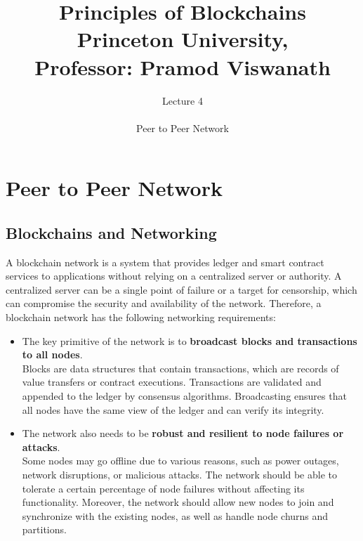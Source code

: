 \documentclass{report}
\title{\Huge{Principles of Blockchains \\ Princeton University,\\
		Professor: Pramod Viswanath}}
\author{\huge{Lecture 4} \\\\ Peer to Peer Network}
\begin{document}
\maketitle
\newpage%
\tableofcontents
\pagebreak

\chapter{Peer to Peer Network}
\section{Blockchains and Networking}
A blockchain network is a system that provides ledger and smart contract services to applications without relying on a centralized server or authority. A centralized server can be a single point of failure or a target for censorship, which can compromise the security and availability of the network. Therefore, a blockchain network has the following networking requirements:
\begin{itemize}
	\item 
	The key primitive of the network is to \textbf{broadcast blocks and transactions to all nodes}.\\ Blocks are data structures that contain transactions, which are records of value transfers or contract executions. Transactions are validated and appended to the ledger by consensus algorithms. Broadcasting ensures that all nodes have the same view of the ledger and can verify its integrity.
	\item 
	The network also needs to be \textbf{robust and resilient to node failures or attacks}. \\ Some nodes may go offline due to various reasons, such as power outages, network disruptions, or malicious attacks. The network should be able to tolerate a certain percentage of node failures without affecting its functionality. Moreover, the network should allow new nodes to join and synchronize with the existing nodes, as well as handle node churns and partitions.
\end{itemize}
\end{document}
